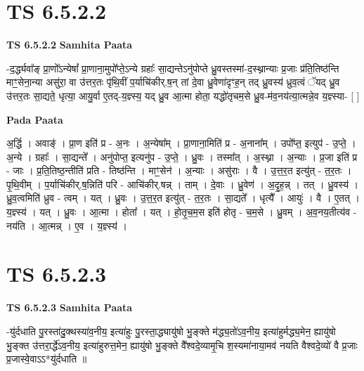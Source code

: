 \documentclass[17pt]{extarticle}
\begin{document}
\section*{ TS 6.5.2.2 }

\textbf{TS 6.5.2.2 } \newline
\textbf{Samhita Paata} \newline

-द॒र्द्ध्यवा᳚ङ् प्रा॒णो᳚ऽन्येषां᳚ प्रा॒णाना॒मुपो᳚प्ते॒ऽन्ये ग्रहाः᳚ सा॒द्यन्तेऽनु॑पोप्ते ध्रु॒वस्तस्मा॑-द॒स्थ्नान्याः प्र॒जाः प्र॑ति॒तिष्ठ॑न्ति माꣳ॒॒सेना॒न्या असु॑रा॒ वा उ॑त्तर॒तः पृ॑थि॒वीं प॒र्याचि॑कीर्.ष॒न् तां दे॒वा ध्रु॒वेणा॑दृꣳह॒न् तद् ध्रु॒वस्य॑ ध्रुव॒त्वं ॅयद् ध्रु॒व उ॑त्तर॒तः सा॒द्यते॒ धृत्या॒ आयु॒र्वा ए॒तद्-य॒ज्ञ्स्य॒ यद् ध्रु॒व आ॒त्मा होता॒ यद्धो॑तृचम॒से ध्रु॒व-म॑व॒नय॑त्या॒त्मन्ने॒व य॒ज्ञ्स्या- [  ] \newline

\textbf{Pada Paata} \newline

अ॒र्द्धि । अवाङ्॑ । प्रा॒ण इति॑ प्र - अ॒नः । अ॒न्येषा᳚म् । प्रा॒णाना॒मिति॑ प्र - अ॒नाना᳚म् । उपो᳚प्त॒ इत्युप॑ - उ॒प्ते॒ । अ॒न्ये । ग्रहाः᳚ । सा॒द्यन्ते᳚ । अनु॑पोप्त॒ इत्यनु॑प - उ॒प्ते॒ । ध्रु॒वः । तस्मा᳚त् । अ॒स्थ्ना । अ॒न्याः । प्र॒जा इति॑ प्र - जाः । प्र॒ति॒तिष्ठ॒न्तीति॑ प्रति - तिष्ठ॑न्ति । माꣳ॒॒सेन॑ । अ॒न्याः । असु॑राः । वै । उ॒त्त॒र॒त इत्यु॑त् - त॒र॒तः । पृ॒थि॒वीम् । प॒र्याचि॑कीर्.ष॒न्निति॑ परि - आचि॑कीर्.षन्न् । ताम् । दे॒वाः । ध्रु॒वेण॑ । अ॒दृ॒ह॒न्न् । तत् । ध्रु॒वस्य॑ । ध्रु॒व॒त्वमिति॑ ध्रुव - त्वम् । यत् । ध्रु॒वः । उ॒त्त॒र॒त इत्यु॑त् - त॒र॒तः । सा॒द्यते᳚ । धृत्यै᳚ । आयुः॑ । वै । ए॒तत् । य॒ज्ञ्स्य॑ । यत् । ध्रु॒वः । आ॒त्मा । होता᳚ । यत् । हो॒तृ॒च॒म॒स इति॑ होतृ - च॒म॒से । ध्रु॒वम् । अ॒व॒नय॒तीत्य॑व - नय॑ति । आ॒त्मन्न् । ए॒व । य॒ज्ञ्स्य॑ ।  \newline




\section*{ TS 6.5.2.3 }

\textbf{TS 6.5.2.3 } \newline
\textbf{Samhita Paata} \newline

-यु॑र्दधाति पु॒रस्ता॑दु॒क्थस्या॑व॒नीय॒ इत्या॑हुः पु॒रस्ता॒द्ध्यायु॑षो भु॒ङ्क्ते म॑द्ध्य॒तो॑ऽव॒नीय॒ इत्या॑हुर्मद्ध्य॒मेन॒ ह्यायु॑षो भु॒ङ्क्त उ॑त्तरा॒र्द्धे॑ऽव॒नीय॒ इत्या॑हुरुत्त॒मेन॒ ह्यायु॑षो भु॒ङ्क्ते वै᳚श्वदे॒व्यामृ॒चि श॒स्यमा॑नाया॒मव॑ नयति वैश्वदे॒व्यो॑ वै प्र॒जाः प्र॒जास्वे॒वाऽऽ*यु॑र्दधाति ॥ \newline
\end{document}
